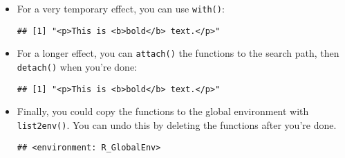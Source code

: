 \begin{itemize}
\item
  For a very temporary effect, you can use \texttt{with()}:

\begin{Shaded}
\begin{Highlighting}[]
\NormalTok{(}\NormalTok{, }\NormalTok{(}\NormalTok{), }\NormalTok{))}
\end{Highlighting}
\end{Shaded}

\begin{verbatim}
## [1] "<p>This is <b>bold</b> text.</p>"
\end{verbatim}
\item
  For a longer effect, you can \texttt{attach()} the functions to the
  search path, then \texttt{detach()} when you're done:

\begin{Shaded}
\begin{Highlighting}[]
\NormalTok{(}\NormalTok{, }\NormalTok{(}\NormalTok{), }\NormalTok{)}
\end{Highlighting}
\end{Shaded}

\begin{verbatim}
## [1] "<p>This is <b>bold</b> text.</p>"
\end{verbatim}

\begin{Shaded}
\begin{Highlighting}[]
\end{Highlighting}
\end{Shaded}
\item
  Finally, you could copy the functions to the global environment with
  \texttt{list2env()}. You can undo this by deleting the functions after
  you're done. 

\begin{Shaded}
\begin{Highlighting}[]
\NormalTok{())}
\end{Highlighting}
\end{Shaded}

\begin{verbatim}
## <environment: R_GlobalEnv>
\end{verbatim}


\end{itemize}
